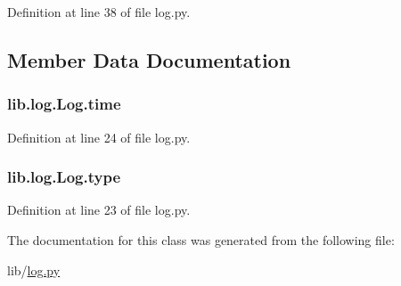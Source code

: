 Definition at line 38 of file log.\+py.



\subsection{Member Data Documentation}
\subsubsection[{\texorpdfstring{time}{time}}]{\setlength{\rightskip}{0pt plus 5cm}lib.\+log.\+Log.\+time}\hypertarget{classlib_1_1log_1_1_log_a1c5cec444134f711805cdd18ccb5c966}{}\label{classlib_1_1log_1_1_log_a1c5cec444134f711805cdd18ccb5c966}


Definition at line 24 of file log.\+py.

\subsubsection[{\texorpdfstring{type}{type}}]{\setlength{\rightskip}{0pt plus 5cm}lib.\+log.\+Log.\+type}\hypertarget{classlib_1_1log_1_1_log_ac2d76302c8228adea2a1824993ff8d51}{}\label{classlib_1_1log_1_1_log_ac2d76302c8228adea2a1824993ff8d51}


Definition at line 23 of file log.\+py.



The documentation for this class was generated from the following file\+:\begin{DoxyCompactItemize}
\item 
lib/\hyperlink{log_8py}{log.\+py}\end{DoxyCompactItemize}
